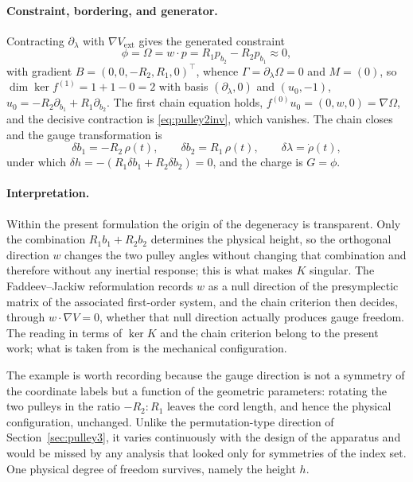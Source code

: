 \documentclass[12pt]{article}
\theoremstyle{plain}
\theoremstyle{definition}
\theoremstyle{remark}
\newcommand{\Om}{\Omega}
\begin{document}
	\paragraph{Constraint, bordering, and generator.} Contracting
	$\partial_{\lambda}$ with $\nabla V_{\mathrm{ext}}$ gives the generated
	constraint
	\begin{equation}
		\phi=\Om=w\!\cdot\!p=R_{1}p_{b_{2}}-R_{2}p_{b_{1}}\approx0,
		\label{eq:pulley2phi}
	\end{equation}
	with gradient $B=(0,0,-R_{2},R_{1},0)^{\top}$, whence
	$\Gamma=\partial_{\lambda}\Om=0$ and $M=(0)$, so
	$\dim\ker f^{(1)}=1+1-0=2$ with basis $(\partial_{\lambda},0)$ and
	$(u_{0},-1)$, $u_{0}=-R_{2}\partial_{b_{1}}+R_{1}\partial_{b_{2}}$. The first
	chain equation holds, $f^{(0)}u_{0}=(0,w,0)=\nabla\Om$, and the decisive
	contraction is \eqref{eq:pulley2inv}, which vanishes. The chain closes and
	the gauge transformation is
	\begin{equation}
		\delta b_{1}=-R_{2}\,\rho(t),
		\qquad
		\delta b_{2}=R_{1}\,\rho(t),
		\qquad
		\delta\lambda=\dot\rho(t),
		\label{eq:pulley2gauge}
	\end{equation}
	under which $\delta h=-(R_{1}\delta b_{1}+R_{2}\delta b_{2})=0$, and the charge
	is $G=\phi$.
	
	\paragraph{Interpretation.} Within the present formulation the origin of the
	degeneracy is transparent. Only the combination $R_{1}b_{1}+R_{2}b_{2}$
	determines the physical height, so the orthogonal direction $w$ changes the two
	pulley angles without changing that combination and therefore without any
	inertial response; this is what makes $K$ singular. The Faddeev--Jackiw
	reformulation records $w$ as a null direction of the presymplectic matrix of the
	associated first-order system, and the chain criterion then decides, through
	$w\!\cdot\!\nabla V=0$, whether that null direction actually produces gauge
	freedom. The reading in terms of $\ker K$ and the chain criterion belong to the
	present work; what is taken from \cite{Brown2023} is the mechanical
	configuration.
	
	The example is worth recording because the gauge direction is not a symmetry of
	the coordinate labels but a function of the geometric parameters: rotating the
	two pulleys in the ratio $-R_{2}:R_{1}$ leaves the cord length, and hence the
	physical configuration, unchanged. Unlike the permutation-type direction of
	Section~\ref{sec:pulley3}, it varies continuously with the design of the
	apparatus and would be missed by any analysis that looked only for symmetries of
	the index set. One physical degree of freedom survives, namely the height $h$.
	
\end{document}
